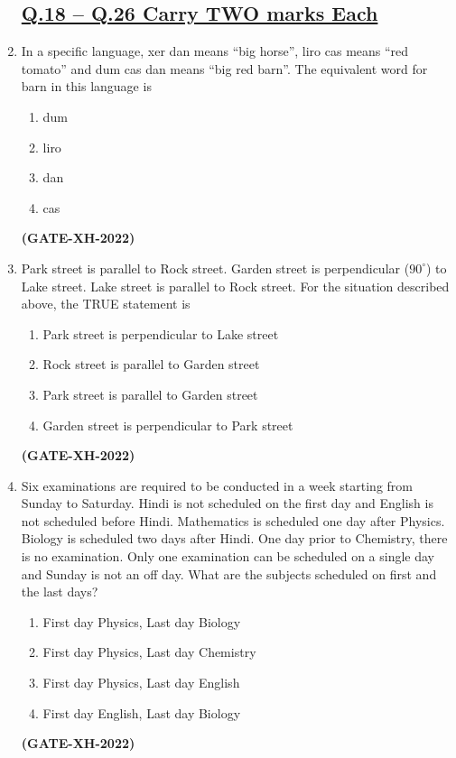 \documentclass[journal]{IEEEtran}
\begin{document}
\begin{enumerate}
\subsection*{\underline{\textbf {Q.18 – Q.26 Carry TWO marks Each}}}

\item In a specific language, xer dan means ``big horse'', liro cas means ``red tomato'' and dum cas dan means ``big red barn''. The equivalent word for barn in this language is
\begin{enumerate}
\item dum
\item liro
\item dan
\item cas
\end{enumerate}
\hfill\textbf{(GATE-XH-2022)}

\item Park street is parallel to Rock street. Garden street is perpendicular ($90^\circ$) to Lake street. Lake street is parallel to Rock street. For the situation described above, the TRUE statement is
\begin{enumerate}
\item Park street is perpendicular to Lake street
\item Rock street is parallel to Garden street
\item Park street is parallel to Garden street
\item Garden street is perpendicular to Park street
\end{enumerate}
\hfill\textbf{(GATE-XH-2022)}

\item Six examinations are required to be conducted in a week starting from Sunday to Saturday. Hindi is not scheduled on the first day and English is not scheduled before Hindi. Mathematics is scheduled one day after Physics. Biology is scheduled two days after Hindi. One day prior to Chemistry, there is no examination. Only one examination can be scheduled on a single day and Sunday is not an off day. What are the subjects scheduled on first and the last days?
\begin{enumerate}
\item First day Physics, Last day Biology
\item First day Physics, Last day Chemistry
\item First day Physics, Last day English
\item First day English, Last day Biology
\end{enumerate}
\hfill\textbf{(GATE-XH-2022)}


\end{enumerate}
\end{document}
